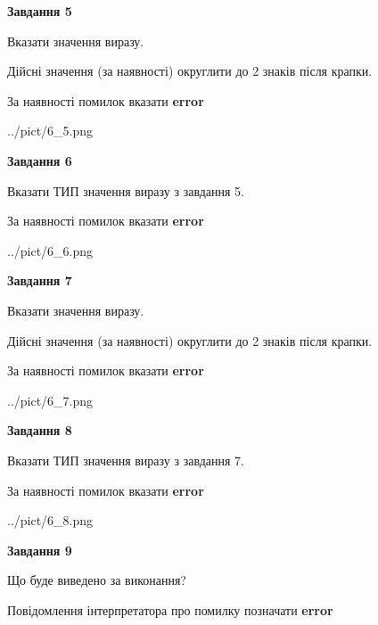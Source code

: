 \documentclass[11pt, ukrainian]{article}
\begin{document}
{\begin {large}
{\begin {center}\textbf{Завдання 5}\end {center}}\par
Вказати значення виразу. \par
Дійсні значення (за наявності) округлити до 2 знаків після крапки. \par
За наявності помилок вказати \textbf{error}

\begin{center}
	{../pict/6_5.png}
\end{center}
\newpage

{\begin {center}\textbf{Завдання 6}\end {center}}\par
Вказати ТИП значення виразу з завдання 5. \par
За наявності помилок вказати \textbf{error}

\begin{center}
	{../pict/6_6.png}
\end{center}
\newpage

{\begin {center}\textbf{Завдання 7}\end {center}}\par
Вказати значення виразу. \par
Дійсні значення (за наявності) округлити до 2 знаків після крапки. \par
За наявності помилок вказати \textbf{error}

\begin{center}
	{../pict/6_7.png}
\end{center}
\newpage

{\begin {center}\textbf{Завдання 8}\end {center}}\par
Вказати ТИП значення виразу з завдання 7. \par
За наявності помилок вказати \textbf{error}

\begin{center}
	{../pict/6_8.png}
\end{center}
\newpage

{\begin {center}\textbf{Завдання 9}\end {center}}\par
Що буде виведено за виконання? \par
Повідомлення інтерпретатора про помилку позначати \textbf{error}


\end{large}}
\end{document}
